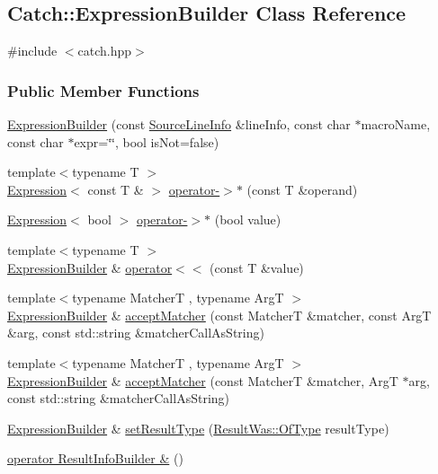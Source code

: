 \hypertarget{classCatch_1_1ExpressionBuilder}{\subsection{Catch\-:\-:Expression\-Builder Class Reference}
\label{classCatch_1_1ExpressionBuilder}
}


{\ttfamily \#include $<$catch.\-hpp$>$}

\subsubsection*{Public Member Functions}
\begin{DoxyCompactItemize}
\item 
\hyperlink{classCatch_1_1ExpressionBuilder_ace5fb1d3d95924fd928443fb8c2614d6}{Expression\-Builder} (const \hyperlink{structCatch_1_1SourceLineInfo}{Source\-Line\-Info} \&line\-Info, const char $\ast$macro\-Name, const char $\ast$expr=\char`\"{}\char`\"{}, bool is\-Not=false)
\item 
{\footnotesize template$<$typename T $>$ }\\\hyperlink{classCatch_1_1Expression}{Expression}$<$ const T \& $>$ \hyperlink{classCatch_1_1ExpressionBuilder_a3af0b2041ebfab8c0c05d4e65102bb6e}{operator-\/$>$$\ast$} (const T \&operand)
\item 
\hyperlink{classCatch_1_1Expression}{Expression}$<$ bool $>$ \hyperlink{classCatch_1_1ExpressionBuilder_a5c783bea5d398fd36a351f758349f317}{operator-\/$>$$\ast$} (bool value)
\item 
{\footnotesize template$<$typename T $>$ }\\\hyperlink{classCatch_1_1ExpressionBuilder}{Expression\-Builder} \& \hyperlink{classCatch_1_1ExpressionBuilder_a0ec28bcd4789a85c20543358087cad4e}{operator$<$$<$} (const T \&value)
\item 
{\footnotesize template$<$typename Matcher\-T , typename Arg\-T $>$ }\\\hyperlink{classCatch_1_1ExpressionBuilder}{Expression\-Builder} \& \hyperlink{classCatch_1_1ExpressionBuilder_a24b9ddd2dc8bd1ce02d9db614f1de490}{accept\-Matcher} (const Matcher\-T \&matcher, const Arg\-T \&arg, const std\-::string \&matcher\-Call\-As\-String)
\item 
{\footnotesize template$<$typename Matcher\-T , typename Arg\-T $>$ }\\\hyperlink{classCatch_1_1ExpressionBuilder}{Expression\-Builder} \& \hyperlink{classCatch_1_1ExpressionBuilder_a72f02a5d86ab6293884bf3196eb56aa7}{accept\-Matcher} (const Matcher\-T \&matcher, Arg\-T $\ast$arg, const std\-::string \&matcher\-Call\-As\-String)
\item 
\hyperlink{classCatch_1_1ExpressionBuilder}{Expression\-Builder} \& \hyperlink{classCatch_1_1ExpressionBuilder_a35db86c0b9cf13cec57f1cd0fbb80100}{set\-Result\-Type} (\hyperlink{structCatch_1_1ResultWas_a624e1ee3661fcf6094ceef1f654601ef}{Result\-Was\-::\-Of\-Type} result\-Type)
\item 
\hyperlink{classCatch_1_1ExpressionBuilder_ab7c53debf1bfd505ae404665363248fe}{operator Result\-Info\-Builder \&} ()
\end{DoxyCompactItemize}


